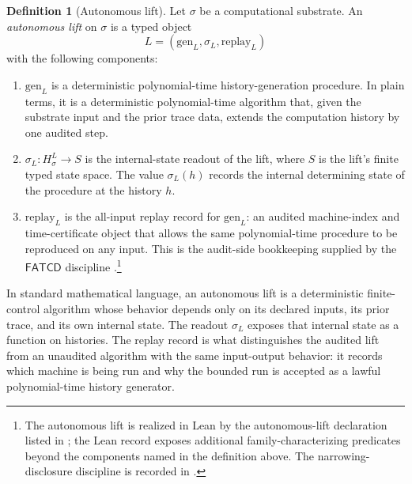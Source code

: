 \documentclass[11pt]{article}
\newcommand{\Substrate}{\sigma}             \newcommand{\Lift}{L}                       \newcommand{\LiftState}{\sigma_{L}}         \newcommand{\HistorySpace}{H_{\Substrate}^{\Lift}}
\newcommand{\FATCD}{\mathsf{FATCD}}
\theoremstyle{definition}
\newtheorem{definition}[theorem]{Definition}
\begin{document}
\begin{definition}[Autonomous lift]
\label{def:autonomous-lift}
Let \(\Substrate\) be a computational substrate.  An
\emph{autonomous lift} on \(\Substrate\) is a typed object
\[
  \Lift=(\mathrm{gen}_{\Lift},\LiftState,\mathrm{replay}_{\Lift})
\]
with the following components:
\begin{enumerate}
  \item \(\mathrm{gen}_{\Lift}\) is a deterministic polynomial-time
  history-generation procedure.  In plain terms, it is a deterministic
  polynomial-time algorithm that, given the substrate input and the
  prior trace data, extends the computation history by one audited
  step.
  \item \(\LiftState:\HistorySpace\to S\) is the internal-state
  readout of the lift, where \(S\) is the lift's finite typed state
  space.  The value \(\LiftState(h)\) records the internal determining
  state of the procedure at the history \(h\).
  \item \(\mathrm{replay}_{\Lift}\) is the all-input replay record for
  \(\mathrm{gen}_{\Lift}\): an audited machine-index and
  time-certificate object that allows the same polynomial-time
  procedure to be reproduced on any input.  This is the audit-side
  bookkeeping supplied by the \(\FATCD\) discipline
  \citep{TsiokosFoundationsII2026}.\footnote{The autonomous lift is
  realized in Lean by the autonomous-lift declaration listed in
  ; the Lean record exposes additional
  family-characterizing predicates beyond the components named in the
  definition above.  The narrowing-disclosure discipline is recorded in
  .}
\end{enumerate}
\end{definition}

In standard mathematical language, an autonomous lift is a deterministic
finite-control algorithm whose behavior depends only on its declared
inputs, its prior trace, and its own internal state.  The readout
\(\LiftState\) exposes that internal state as a function on histories.
The replay record is what distinguishes the audited lift from an
unaudited algorithm with the same input-output behavior: it records
which machine is being run and why the bounded run is accepted as a
lawful polynomial-time history generator.
\end{document}
